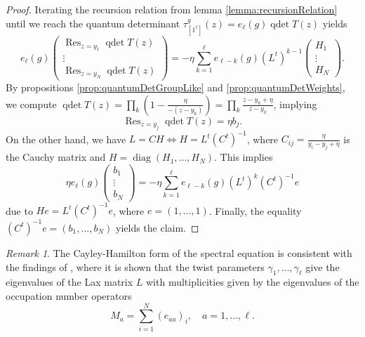 \documentclass[11pt]{report}
\theoremstyle{definition}
\theoremstyle{remark}
\newtheorem*{remark}{Remark}
\theoremstyle{remark}
\begin{document}
\begin{proof}
Iterating the recursion relation from lemma \ref{lemma:recursionRelation} until we reach the quantum determinant $\tau_{[1^\ell]}^g(z) = e_\ell(g) \operatorname{qdet} T(z)$ yields
\begin{equation*}
e_\ell(g)
\begin{pmatrix}
\operatorname{Res}_{z=y_1} \operatorname{qdet} T(z) \\ \vdots \\ \operatorname{Res}_{z=y_N} \operatorname{qdet} T(z)
\end{pmatrix}
= -\eta \sum_{k=1}^\ell e_{\ell-k}(g) (L^t)^{k-1}
\begin{pmatrix}
H_1 \\ \vdots \\ H_N
\end{pmatrix}.
\end{equation*}
By propositions \ref{prop:quantumDetGroupLike} and \ref{prop:quantumDetWeights}, we compute $\operatorname{qdet} T(z) = \prod_k \left( 1-\frac{\eta}{-(z-y_k)} \right) = \prod_k \frac{z-y_k+\eta}{z-y_k}$, implying
\begin{equation*}
\operatorname{Res}_{z=y_j} \operatorname{qdet} T(z) = \eta b_j.
\end{equation*}
On the other hand, we have $L = CH \Leftrightarrow H = L^t (C^t)^{-1}$, where $C_{ij} = \frac{\eta}{y_i-y_j+\eta}$ is the Cauchy matrix and $H = \operatorname{diag}(H_1,...,H_N)$.
This implies
\begin{equation*}
\eta e_\ell(g)
\begin{pmatrix}
b_1 \\ \vdots \\ b_N
\end{pmatrix}
= -\eta \sum_{k=1}^\ell e_{\ell-k}(g) (L^t)^k (C^t)^{-1} e
\end{equation*}
due to $H e = L^t (C^t)^{-1} e$, where $e = (1,...,1)$. Finally, the equality $(C^t)^{-1} e = (b_1,...,b_N)$ yields the claim.
\end{proof}

\begin{remark}
The Cayley-Hamilton form of the spectral equation is consistent with the findings of \cite{article:gorsky:2014}, where it is shown that the twist parameters $\gamma_1,...,\gamma_\ell$ give the eigenvalues of the Lax matrix $L$ with multiplicities given by the eigenvalues of the occupation number operators
\begin{equation}\label{equation:occupationNumber}
M_a = \sum_{i=1}^N (e_{aa})_i, \quad a=1,...,\ell.
\end{equation}
\end{remark}
\end{document}
